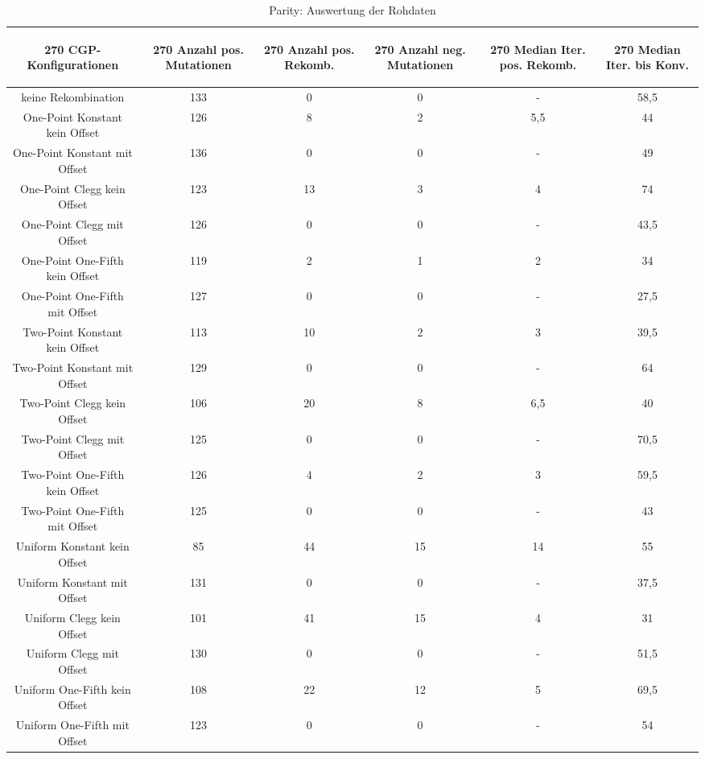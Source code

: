 \begin{table}[H]
	\centering
	\begin{tabular}{c | c | c | c | c | c }
		\begin{turn}{270} \textbf{CGP-Konfigurationen} \end{turn} & \begin{turn}{270} \textbf{Anzahl pos. Mutationen} \end{turn} & \begin{turn}{270} \textbf{Anzahl pos. Rekomb.} \end{turn} & \begin{turn}{270} \textbf{Anzahl neg. Mutationen} \end{turn} & \begin{turn}{270} \textbf{Median Iter. pos. Rekomb.} \end{turn} & \begin{turn}{270} \textbf{Median Iter. bis Konv.} \end{turn}\\
		\hline
		keine Rekombination & 133 & 0 & 0 & - & 58,5\\
		\hline
		One-Point Konstant kein Offset & 126 & 8 & 2 & 5,5 & 44\\
		\hline
		One-Point Konstant mit Offset & 136 & 0 & 0 & - & 49\\
		\hline
		One-Point Clegg kein Offset & 123 & 13 & 3 & 4 & 74\\
		\hline
		One-Point Clegg mit Offset & 126 & 0 & 0 & - & 43,5\\
		\hline
		One-Point One-Fifth kein Offset & 119 & 2 & 1 & 2 & 34\\
		\hline
		One-Point One-Fifth mit Offset & 127 & 0 & 0 & - & 27,5\\
		\hline
		Two-Point Konstant kein Offset & 113 & 10 & 2 & 3 & 39,5\\
		\hline
		Two-Point Konstant mit Offset & 129 & 0 & 0 & - & 64\\
		\hline
		Two-Point Clegg kein Offset & 106 & 20 & 8 & 6,5 & 40\\
		\hline
		Two-Point Clegg mit Offset & 125 & 0 & 0 & - & 70,5\\
		\hline
		Two-Point One-Fifth kein Offset & 126 & 4 & 2 & 3 & 59,5\\
		\hline
		Two-Point One-Fifth mit Offset & 125 & 0 & 0 & - & 43\\
		\hline
		Uniform Konstant kein Offset & 85 & 44 & 15 & 14 & 55\\
		\hline
		Uniform Konstant mit Offset & 131 & 0 & 0 & - & 37,5\\
		\hline
		Uniform Clegg kein Offset & 101 & 41 & 15 & 4 & 31\\
		\hline
		Uniform Clegg mit Offset & 130 & 0 & 0 & - & 51,5\\
		\hline
		Uniform One-Fifth kein Offset & 108 & 22 & 12 & 5 & 69,5\\
		\hline
		Uniform One-Fifth mit Offset & 123 & 0 & 0 & - & 54\\
	\end{tabular}
	\caption{Parity: Auswertung der Rohdaten}
	\label{table:parityRohdaten}
\end{table}


